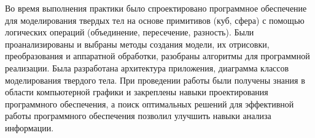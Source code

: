 \Conclusion %

Во время выполнения практики было спроектировано программное обеспечение для моделирования твердых тел на основе примитивов (куб, сфера) с помощью
логических операций (объединение, пересечение, разность). 
Были проанализированы и выбраны методы создания модели, их отрисовки, преобразования и аппаратной обработки, 
разобраны алгоритмы для программной реализации.
Была разработана архитектура приложения, диаграмма классов моделирования твердого тела. 
При проведении работы были получены знания в области компьютерной графики и закреплены навыки проектирования программного обеспечения, а поиск оптимальных решений для эффективной работы программного обеспечения позволил улучшить навыки анализа информации.

